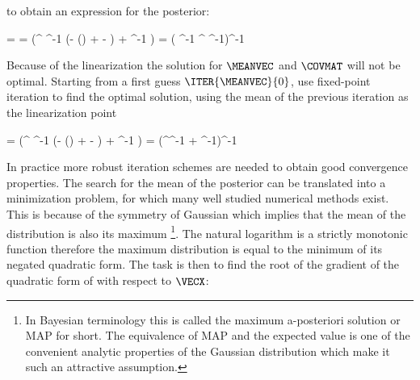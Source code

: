     to obtain an expression for the posterior:
    
    \startformula
    \startalign[n=2,align={right,left}]
        \NC \POSTERIOR = \NC \GAUSS{\VECX}{\MEANVEC}{\COVMAT} \NR
        \NC \MEANVEC = \NC \COVMAT (^\top
            \COVMATERR^{-1} (\VECY - \FWD()
            +   - \MEANVECERR)
            + \COVMATA^{-1} \MEANVECA) \NR
        \NC \COVMAT = \NC 
            ( \COVMATERR^{-1} ^\top
            \COVMATA^{-1})^{-1} \NR
    \stopalign
    \stopformula
    
    Because of the linearization the solution for $\MEANVEC$ and $\COVMAT$ will
    not be optimal. Starting from a first guess $\ITER{\MEANVEC}{0}$, use
    fixed-point iteration to find the optimal solution, using the mean of the
    previous iteration as the linearization point

    \startsubformulas[eq:gausspostiter]
    \placesubformula
    \startformula
    \startalign[n=3,align={right,left,right}]
        \NC {} = \NC
             (^\top
            \COVMATERR^{-1} (\VECY - \FWD()
            +   - \MEANVECERR)
            + \COVMATA^{-1} \MEANVECA) \EQCOMMA \NC \NR[eq:gausspostmeaniter][a]
        \NC {} = \NC
            (^\top \COVMATERR^{-1} 
            + \COVMATA^{-1})^{-1}
            \EQSTOP \NC \NR[eq:gausspostcoviter][b]
    \stopalign
    \stopformula
    \stopsubformulas

    In practice more robust iteration schemes are needed to obtain good
    convergence properties. The search for the mean of the posterior can be
    translated into a minimization problem, for which many well studied
    numerical methods exist. This is because of the symmetry of Gaussian which
    implies that the mean of the distribution is also its maximum \footnote{In
    Bayesian terminology this is called the maximum a-posteriori solution or
    MAP for short. The equivalence of MAP and the expected value is one of the
    convenient analytic properties of the Gaussian distribution which make it
    such an attractive assumption.}. The natural logarithm is a strictly
    monotonic function therefore the maximum distribution is equal to the
    minimum of its negated quadratic form. The task is then to find the root of
    the gradient of the quadratic form of  with
    respect to $\VECX$:

